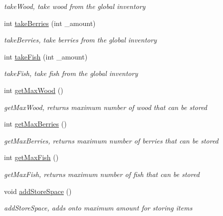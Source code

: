 \begin{DoxyCompactItemize}
\begin{DoxyCompactList}\small\item\em take\+Wood, take wood from the global inventory \end{DoxyCompactList}\item 
int \hyperlink{class_inventory_a02d5441c18093a68ce6fbf6b4306212e}{take\+Berries} (int \+\_\+amount)
\begin{DoxyCompactList}\small\item\em take\+Berries, take berries from the global inventory \end{DoxyCompactList}\item 
int \hyperlink{class_inventory_a883cf42541a46a27f1acbdb5e8274190}{take\+Fish} (int \+\_\+amount)
\begin{DoxyCompactList}\small\item\em take\+Fish, take fish from the global inventory \end{DoxyCompactList}\item 
int \hyperlink{class_inventory_a68a43af73c512bea2073cb6acc5f256f}{get\+Max\+Wood} ()
\begin{DoxyCompactList}\small\item\em get\+Max\+Wood, returns maximum number of wood that can be stored \end{DoxyCompactList}\item 
int \hyperlink{class_inventory_a775ce8ba8c0492e80637aa0cb4f85aff}{get\+Max\+Berries} ()
\begin{DoxyCompactList}\small\item\em get\+Max\+Berries, returns maximum number of berries that can be stored \end{DoxyCompactList}\item 
int \hyperlink{class_inventory_a7ba388cc1b56b751b9b996a3cae609d8}{get\+Max\+Fish} ()
\begin{DoxyCompactList}\small\item\em get\+Max\+Fish, returns maximum number of fish that can be stored \end{DoxyCompactList}\item 
\hypertarget{class_inventory_a0f02fa71866c3d4ea25108824c8ed8ee}{}void \hyperlink{class_inventory_a0f02fa71866c3d4ea25108824c8ed8ee}{add\+Store\+Space} ()\label{class_inventory_a0f02fa71866c3d4ea25108824c8ed8ee}

\begin{DoxyCompactList}\small\item\em add\+Store\+Space, adds onto maximum amount for storing items \end{DoxyCompactList}\end{DoxyCompactItemize}


